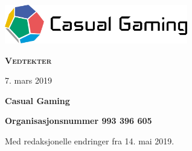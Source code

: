 \begin{titlepage}
    \centering
    \vspace*{1cm}
    \includegraphics[width=8cm]{innhold/logo-farger-tekst.png}\par
    \vspace*{4cm}
    {\rmfamily\Huge\bfseries\scshape Vedtekter}\par
    \vspace*{1cm}
    {7. mars 2019}\par
    \vfill
    {\bfseries Casual Gaming}\par
    \vspace*{0.5cm}
    {\bfseries Organisasjonsnummer 993 396 605}\par
    \vspace*{0.5cm}
    {Med redaksjonelle endringer fra 14. mai 2019.}\par
\end{titlepage}
